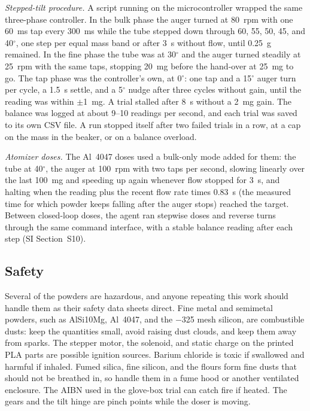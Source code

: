 \documentclass[twoside,twocolumn,9pt]{article}
\begin{document}
\emph{Stepped-tilt procedure.} A script running on the microcontroller wrapped the same three-phase controller. In the bulk phase the auger turned at 80~rpm with one 60~ms tap every 300~ms while the tube stepped down through 60, 55, 50, 45, and 40$^\circ$, one step per equal mass band or after 3~s without flow, until 0.25~g remained. In the fine phase the tube was at 30$^\circ$ and the auger turned steadily at 25~rpm with the same taps, stopping 20~mg before the hand-over at 25~mg to go. The tap phase was the controller's own, at 0$^\circ$: one tap and a 15$^\circ$ auger turn per cycle, a 1.5~s settle, and a 5$^\circ$ nudge after three cycles without gain, until the reading was within $\pm$1~mg. A trial stalled after 8~s without a 2~mg gain. The balance was logged at about 9--10 readings per second, and each trial was saved to its own CSV file. A run stopped itself after two failed trials in a row, at a cap on the mass in the beaker, or on a balance overload.

\emph{Atomizer doses.} The Al~4047 doses used a bulk-only mode added for them: the tube at 40$^\circ$, the auger at 100~rpm with two taps per second, slowing linearly over the last 100~mg and speeding up again whenever flow stopped for 3~s, and halting when the reading plus the recent flow rate times 0.83~s (the measured time for which powder keeps falling after the auger stops) reached the target. Between closed-loop doses, the agent ran stepwise doses and reverse turns through the same command interface, with a stable balance reading after each step (SI Section~S10).

\subsection{Safety}
Several of the powders are hazardous, and anyone repeating this work should handle them as their safety data sheets direct. Fine metal and semimetal powders, such as AlSi10Mg, Al~4047, and the $-$325 mesh silicon, are combustible dusts: keep the quantities small, avoid raising dust clouds, and keep them away from sparks. The stepper motor, the solenoid, and static charge on the printed PLA parts are possible ignition sources. Barium chloride is toxic if swallowed and harmful if inhaled. Fumed silica, fine silicon, and the flours form fine dusts that should not be breathed in, so handle them in a fume hood or another ventilated enclosure. The AIBN used in the glove-box trial can catch fire if heated. The gears and the tilt hinge are pinch points while the doser is moving.
\end{document}
